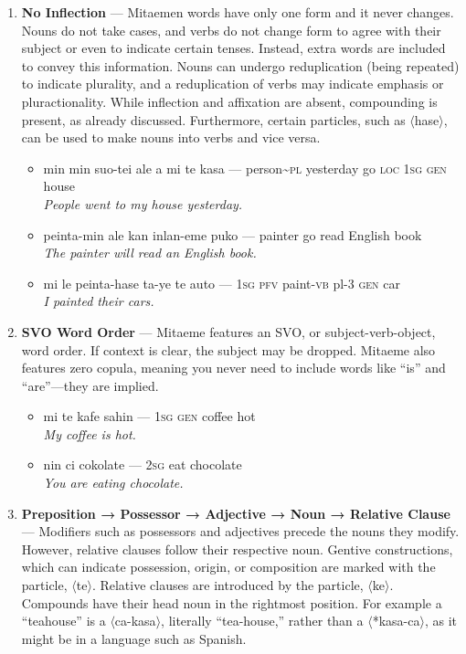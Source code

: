 \documentclass[a4paper]{article}
\begin{document}
\begin{enumerate}
	\item \textbf{No Inflection} — Mitaemen words have only one form and it never changes. Nouns do not take cases, and verbs do not change form to agree with their subject or even to indicate certain tenses. Instead, extra words are included to convey this information. Nouns can undergo reduplication (being repeated) to indicate plurality, and a reduplication of verbs may indicate emphasis or pluractionality. While inflection and affixation are absent, compounding is present, as already discussed.  Furthermore, certain particles, such as $\langle$hase$\rangle$, can be used to make nouns into verbs and vice versa.
	\begin{itemize}
		\item min min suo-tei ale a mi te kasa — person\textasciitilde{}\textsc{pl} yesterday go \textsc{loc 1sg gen} house\\\textit{People went to my house yesterday.}
		\item peinta-min ale kan inlan-eme puko — painter go read English book\\\textit{The painter will read an English book.}
		\item mi le peinta-hase ta-ye te auto — \textsc{1sg pfv} paint-\textsc{vb} pl-3 \textsc{gen} car \\\textit{I painted their cars.}
	\end{itemize}
	\item \textbf{SVO Word Order} — Mitaeme features an SVO, or subject-verb-object, word order. If context is clear, the subject may be dropped. Mitaeme also features zero copula, meaning you never need to include words like ``is'' and ``are''—they are implied.
	\begin{itemize}
		\item mi te kafe sahin — \textsc{1sg} \textsc{gen} coffee hot\\\textit{My coffee is hot.}
		\item nin ci cokolate — \textsc{2sg} eat chocolate\\\textit{You are eating chocolate.}
	\end{itemize}
	\item \textbf{ Preposition → Possessor → Adjective → Noun → Relative Clause  } — Modifiers such as possessors and adjectives precede the nouns they modify. However, relative clauses follow their respective noun. Gentive constructions, which can indicate possession, origin, or composition are marked with the particle, $\langle$te$\rangle$. Relative clauses are introduced by the particle, $\langle$ke$\rangle$. Compounds have their head noun in the rightmost position. For example a ``teahouse'' is a $\langle$ca-kasa$\rangle$, literally ``tea-house,'' rather than a $\langle$*kasa-ca$\rangle$, as it might be in a language such as Spanish.

\end{enumerate}
\end{document}
